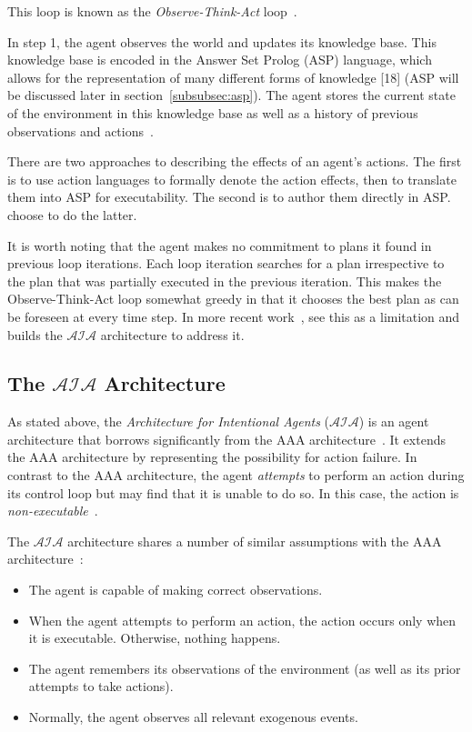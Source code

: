 This loop is known as the \textit{Observe-Think-Act} loop~\citep{balduccini_aaa_2008}.

In step 1, the agent observes the world and updates its knowledge base.
This knowledge base is encoded in the Answer Set Prolog (ASP) language, which allows for the representation of many different forms of knowledge [18] (ASP will be discussed later in section~\ref{subsubsec:asp}).
The agent stores the current state of the environment in this knowledge base as well as a history of previous observations and actions~\citep{balduccini_aaa_2008}.

There are two approaches to describing the effects of an agent's actions.
The first is to use action languages to formally denote the action effects, then to translate them into ASP for executability.
The second is to author them directly in ASP.
\citet{balduccini_aaa_2008} choose to do the latter.

It is worth noting that the agent makes no commitment to plans it found in previous loop iterations.
Each loop iteration searches for a plan irrespective to the plan that was partially executed in the previous iteration.
This makes the Observe-Think-Act loop somewhat greedy in that it chooses the best plan as can be foreseen at every time step.
In more recent work~\citep{blount_towards_2014}, \citeauthor{blount_towards_2014} see this as a limitation and builds the $\mathcal{AIA}$ architecture to address it.

\subsection{The $\mathcal{AIA}$ Architecture}
\label{subsec:aia_architecture}

As stated above, the \textit{Architecture for Intentional Agents} ($\mathcal{AIA}$) is an agent architecture that borrows significantly from the AAA architecture~\citep{blount_towards_2014}.
It extends the AAA architecture by representing the possibility for action failure.
In contrast to the AAA architecture, the agent \textit{attempts} to perform an action during its control loop but may find that it is unable to do so.
In this case, the action is \textit{non-executable}~\citep{blount_towards_2014}.

The $\mathcal{AIA}$ architecture shares a number of similar assumptions with the AAA architecture~\citep{blount_towards_2014}:

\begin{itemize}
    \item The agent is capable of making correct observations.
    \item When the agent attempts to perform an action, the action occurs only when it is executable.
        Otherwise, nothing happens.
    \item The agent remembers its observations of the environment (as well as its prior attempts to take actions).
    \item Normally, the agent observes all relevant exogenous events.
\end{itemize}

